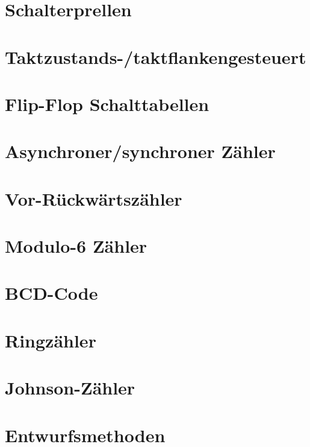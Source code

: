 \documentclass[a4paper, 11pt]{article}
\begin{document}
  
  \clearpage
  \setcounter{page}{1}

  \section{Schalterprellen}
  

  \section{Taktzustands-/taktflankengesteuert}
  

  \section{Flip-Flop Schalttabellen}
  

  \section{Asynchroner/synchroner Zähler}
  

  \section{Vor-Rückwärtszähler}
  

  \section{Modulo-6 Zähler}
  

  \section{BCD-Code}
  

  \section{Ringzähler}
  

  \section{Johnson-Zähler}
  

  \section{Entwurfsmethoden}
  
\end{document}
